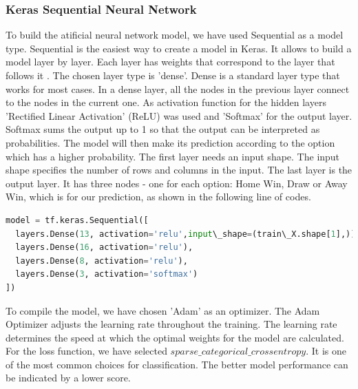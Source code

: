 \subsubsection{Keras Sequential Neural Network}

To build the atificial neural network model, we have used Sequential as a model type. Sequential is the easiest way to create a model in Keras. It allows to build a model layer by layer. Each layer has weights that correspond to the layer that follows it \cite{buildingDLModel}.\newline
The chosen layer type is 'dense'. Dense is a standard layer type that works for most cases. In a dense layer, all the nodes in the previous layer connect to the nodes in the current one.\newline
As activation function for the hidden layers 'Rectified Linear Activation' (ReLU) was used and 'Softmax' for the output layer. Softmax sums the output up to 1 so that the output can be interpreted as probabilities. The model will then make its prediction according to the option which has a higher probability.\newline \newline
The first layer needs an input shape. The input shape specifies the number of rows and columns in the input.\newline
The last layer is the output layer. It has three nodes - one for each option: Home Win, Draw or Away Win, which is for our prediction, as shown in the following line of codes.\newline \newline
\begin{lstlisting}[language=Python, caption=Python code for simple Keras Sequantial Model Instantiation]
model = tf.keras.Sequential([ 
  layers.Dense(13, activation='relu',input\_shape=(train\_X.shape[1],)), 
  layers.Dense(16, activation='relu'),
  layers.Dense(8, activation='relu'),
  layers.Dense(3, activation='softmax')
])
\end{lstlisting}
To compile the model, we have chosen 'Adam' as an optimizer. The Adam Optimizer adjusts the learning rate throughout the training.\newline
The learning rate determines the speed at which the optimal weights for the model are calculated.\newline
For the loss function, we have selected $sparse\_categorical\_crossentropy$. It is one of the most common choices for classification. The better model performance can be indicated by a lower score.\newline \newline
